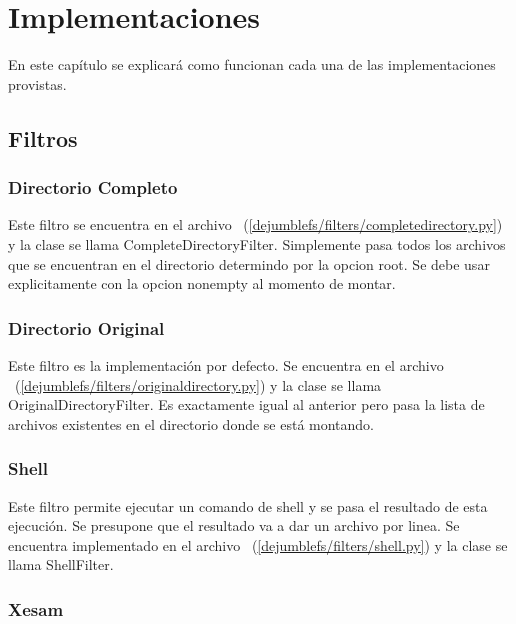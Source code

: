 \chapter{Implementaciones}
\ifpdf
    \graphicspath{{Chapter2/Chapter2Figs/PNG/}{Chapter2/Chapter2Figs/PDF/}{Chapter2/Chapter2Figs/}}
\else
    \graphicspath{{Chapter2/Chapter2Figs/EPS/}{Chapter2/Chapter2Figs/}}
\fi

En este capítulo se explicará como funcionan cada una de las implementaciones provistas.


\section{Filtros}

\subsection{Directorio Completo}

Este filtro se encuentra en el archivo ~(\ref{dejumblefs/filters/completedirectory.py}) y la clase se llama CompleteDirectoryFilter. Simplemente pasa todos los archivos que se encuentran en el directorio determindo por la opcion root. Se debe usar explicitamente con la opcion nonempty al momento de montar.

\subsection{Directorio Original}

Este filtro es la implementación por defecto. Se encuentra en el archivo ~(\ref{dejumblefs/filters/originaldirectory.py}) y la clase se llama OriginalDirectoryFilter. Es exactamente igual al anterior pero pasa la lista de archivos existentes en el directorio donde se está montando.

\subsection{Shell}

Este filtro permite ejecutar un comando de shell y se pasa el resultado de esta ejecución. Se presupone que el resultado va a dar un archivo por linea. Se encuentra implementado en el archivo ~(\ref{dejumblefs/filters/shell.py}) y la clase se llama ShellFilter.

\subsection{Xesam}

